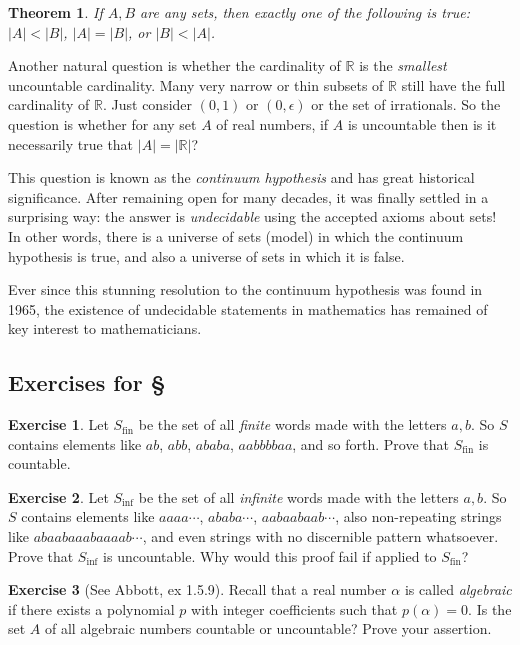 \documentclass[11pt,oneside]{amsbook}
\newcommand{\RR}{\mathbb R}
\theoremstyle{definition}
\newtheorem{exerc}{Exercise}[section]
\theoremstyle{plain}
\newtheorem{thm}{Theorem}[section]
\theoremstyle{definition}
\theoremstyle{remark}
\numberwithin{equation}{section}
\numberwithin{figure}{section}
\begin{document}
\begin{thm}
  If $A,B$ are any sets, then exactly one of the following is true: $|A|<|B|$, $|A|=|B|$, or $|B|<|A|$.
\end{thm}

Another natural question is whether the cardinality of $\RR$ is the \emph{smallest} uncountable cardinality. Many very narrow or thin subsets of $\RR$ still have the full cardinality of $\RR$. Just consider $(0,1)$ or $(0,\epsilon)$ or the set of irrationals. So the question is whether for any set $A$ of real numbers, if $A$ is uncountable then is it necessarily true that $|A|=|\RR|$?

This question is known as the \emph{continuum hypothesis} and has great historical significance. After remaining open for many decades, it was finally settled in a surprising way: the answer is \emph{undecidable} using the accepted axioms about sets! In other words, there is a universe of sets (model) in which the continuum hypothesis is true, and also a universe of sets in which it is false.

Ever since this stunning resolution to the continuum hypothesis was found in 1965, the existence of undecidable statements in mathematics has remained of key interest to mathematicians.

\newpage
\subsection*{Exercises for \S \thesection}

\begin{exerc}
  Let $S_\text{fin}$ be the set of all \emph{finite} words made with the letters $a,b$. So $S$ contains elements like $ab$, $abb$, $ababa$, $aabbbbaa$, and so forth. Prove that $S_\text{fin}$ is countable.
\end{exerc}

\begin{exerc}
  Let $S_\text{inf}$ be the set of all \emph{infinite} words made with the letters $a,b$. So $S$ contains elements like $aaaa\cdots$, $ababa\cdots$, $aabaabaab\cdots$, also non-repeating strings like $abaabaaabaaaab\cdots$, and even strings with no discernible pattern whatsoever. Prove that $S_\text{inf}$ is uncountable. Why would this proof fail if applied to $S_\text{fin}$?
\end{exerc}

\begin{exerc}[See Abbott, ex 1.5.9]
  Recall that a real number $\alpha$ is called \emph{algebraic} if there exists a polynomial $p$ with integer coefficients such that $p(\alpha)=0$. Is the set $A$ of all algebraic numbers countable or uncountable? Prove your assertion.
\end{exerc}
\end{document}
